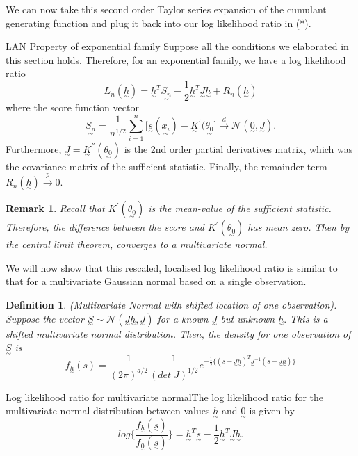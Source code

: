 \documentclass[twoside]{article}
\newtheorem{definition}[theorem]{Definition}
\newtheorem{remark}[theorem]{Remark}
\newcommand{\utilde}{\underset{\sim}}
\begin{document}
We can now take this second order Taylor series expansion of the cumulant generating function and plug it back into our log likelihood ratio in (*).

\begin{proposition_exam}{LAN Property of exponential family}{}
Suppose all the conditions we elaborated in this section holds. Therefore, for an exponential family, we have a log likelihood ratio 
$$
L_n(\utilde{h}) = \utilde{h}^T\utilde{S_n} - \frac{1}{2}\utilde{h}^T\utilde{J}\utilde{h} + R_n(\utilde{h})
$$
where the score function vector
$$
\utilde{S_n} = \frac{1}{n^{1/2}}\sum_{i=1}^{n}\bigg[\utilde{s}(\utilde{x_i}) - \utilde{K}^{'}(\utilde{\theta_0} \bigg] \xrightarrow{d} \mathcal{N}(\utilde{0}, \utilde{J}).
$$
Furthermore, $\utilde{J} = \utilde{K}^{''}(\utilde{\theta_0})$ is the 2nd order partial derivatives matrix, which was the covariance matrix of the sufficient statistic. Finally, the remainder term $R_n(\utilde{h}) \xrightarrow{p} 0.$
\end{proposition_exam}

\begin{remark}Recall that $K^{'}(\utilde{\theta_0})$ is the mean-value of the sufficient statistic. Therefore, the difference between the score and $K^{'}(\utilde{\theta_0})$ has mean zero. Then by the central limit theorem, converges to a multivariate normal.
\end{remark}

We will now show that this rescaled, localised log likelihood ratio is similar to that for a multivariate Gaussian normal based on a single observation.

\begin{definition}(Multivariate Normal with shifted location of one observation). Suppose the vector $\utilde{S} \sim \mathcal{N}(\utilde{J}\utilde{h}, \utilde{J})$ for a known $\utilde{J}$ but unknown $\utilde{h}.$ This is a shifted multivariate normal distribution. Then, the density for one observation of $\utilde{S}$ is 
$$
f_{\utilde{h}}(s) = \frac{1}{(2\pi)^{d/2}}\frac{1}{(det\;J)^{1/2}}e^{-\frac{1}{2}\big\{(s - \utilde{J}\utilde{h})^T\utilde{J}^{-1}(s - \utilde{J}\utilde{h}) \big\}}
$$
\end{definition}

\begin{proposition_exam}{Log likelihood ratio for multivariate normal}{}The log likelihood ratio for the multivariate normal distribution between values $\utilde{h}$ and $\utilde{0}$ is given by 
$$
log\{\frac{f_{\utilde{h}}(\utilde{s})}{f_{\utilde{0}}(\utilde{s})}\} = \utilde{h}^T\utilde{s} - \frac{1}{2}\utilde{h}^T\utilde{J}\utilde{h}.
$$
\end{proposition_exam}
\end{document}
